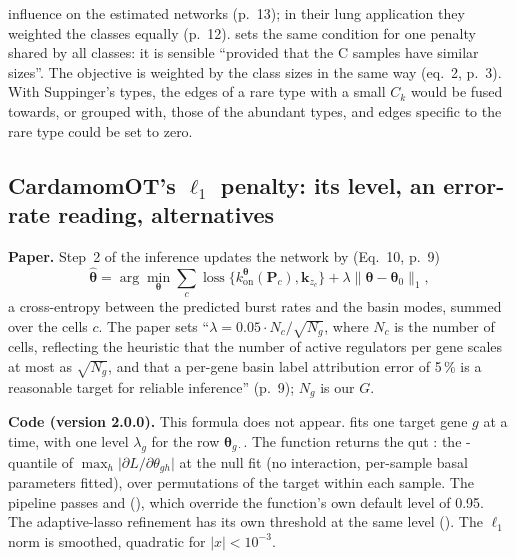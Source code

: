 \documentclass[11pt,a4paper]{article}
\begin{document}
\begin{methodbox}[title={Joint graphical lasso: group versus fused penalty}]
\begin{itemize}
{        influence on the estimated networks} (p.~13); in their lung application they weighted the classes
        equally (p.~12). \textcite[p.~49]{chiquetContributionsSparseMethods2015} sets the same condition
        for one penalty shared by all classes: it is sensible \enquote{provided that the C samples have
        similar sizes}. The  objective is weighted by the class sizes in the same way
        (eq.~2, p.~3). With Suppinger's types, the edges of a rare type with a small $C_k$ would be fused
        towards, or grouped with, those of the abundant types, and edges specific to the rare type could
        be set to zero.
\end{itemize}
\end{methodbox}

\subsection{CardamomOT's \texorpdfstring{$\ell_1$}{l1} penalty: its level, an error-rate reading, alternatives}\label{sec:lambda}

\textbf{Paper.} Step~2 of the inference updates the network by (Eq.~10, p.~9)
\begin{equation}\label{eq:cardamom-l1}
\hat{\bm\theta}=\arg\min_{\bm\theta}\sum_c\operatorname{loss}\bigl\{k^{\bm\theta}_{\mathrm{on}}(\bm P_c),
\bm k_{z_c}\bigr\}+\lambda\lVert\bm\theta-\bm\theta_0\rVert_1,
\end{equation}
a cross-entropy between the predicted burst rates and the basin modes, summed over the cells $c$. The paper
sets \enquote{$\lambda=0.05\cdot N_c/\sqrt{N_g}$, where $N_c$ is the number of cells, reflecting the
heuristic that the number of active regulators per gene scales at most as $\sqrt{N_g}$, and that a per-gene
basin label attribution error of 5\,\% is a reasonable target for reliable inference} (p.~9); $N_g$ is our
$G$.

\textbf{Code (version 2.0.0).} This formula does not appear.  fits one target
gene $g$ at a time, with one level $\lambda_g$ for the row $\bm\theta_{g\cdot}$. The function
 returns the \gls{qut} \parencite{giacobinoQuantileUniversalThreshold2017}: the -quantile of $\max_h\lvert\partial L/\partial
\theta_{gh}\rvert$ at the null fit (no interaction, per-sample basal parameters fitted), over permutations
of the target within each sample. The pipeline passes  and 
(), which override the function's own default level of 0.95. The adaptive-lasso
refinement has its own threshold at the same level (). The $\ell_1$ norm is smoothed,
quadratic for $\lvert x\rvert<10^{-3}$.
\end{document}
